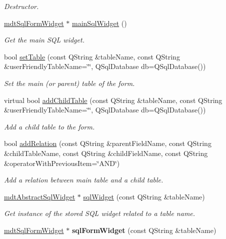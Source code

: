 \begin{DoxyCompactItemize}
\begin{DoxyCompactList}\small\item\em Destructor. \end{DoxyCompactList}\item 
\hyperlink{classmdt_sql_form_widget}{mdtSqlFormWidget} $\ast$ \hyperlink{classmdt_sql_form_old_a18b6cc0c5fd84699a54f374580a2380e}{mainSqlWidget} ()
\begin{DoxyCompactList}\small\item\em Get the main SQL widget. \end{DoxyCompactList}\item 
bool \hyperlink{classmdt_sql_form_old_af9be4e55bac675a073aa5eb0d442e86d}{setTable} (const QString \&tableName, const QString \&userFriendlyTableName=\char`\"{}\char`\"{}, QSqlDatabase db=QSqlDatabase())
\begin{DoxyCompactList}\small\item\em Set the main (or parent) table of the form. \end{DoxyCompactList}\item 
virtual bool \hyperlink{classmdt_sql_form_old_a7a6e64996d14615b449b42969f5a845d}{addChildTable} (const QString \&tableName, const QString \&userFriendlyTableName=\char`\"{}\char`\"{}, QSqlDatabase db=QSqlDatabase())
\begin{DoxyCompactList}\small\item\em Add a child table to the form. \end{DoxyCompactList}\item 
bool \hyperlink{classmdt_sql_form_old_a2817d3049b86ba6bccabd41bc32c7706}{addRelation} (const QString \&parentFieldName, const QString \&childTableName, const QString \&childFieldName, const QString \&operatorWithPreviousItem=\char`\"{}AND\char`\"{})
\begin{DoxyCompactList}\small\item\em Add a relation between main table and a child table. \end{DoxyCompactList}\item 
\hyperlink{classmdt_abstract_sql_widget}{mdtAbstractSqlWidget} $\ast$ \hyperlink{classmdt_sql_form_old_aebb0245ac8f4fee2586cbac61c60db3f}{sqlWidget} (const QString \&tableName)
\begin{DoxyCompactList}\small\item\em Get instance of the stored SQL widget related to a table name. \end{DoxyCompactList}\item 
\hypertarget{classmdt_sql_form_old_ae0e5815ceaced65e8465adc2fe887c51}{
\hyperlink{classmdt_sql_form_widget}{mdtSqlFormWidget} $\ast$ {\bfseries sqlFormWidget} (const QString \&tableName)}
\label{classmdt_sql_form_old_ae0e5815ceaced65e8465adc2fe887c51}


\end{DoxyCompactItemize}

